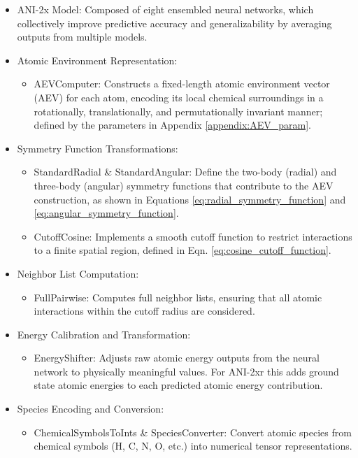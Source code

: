 \begin{itemize}
    \item ANI-2x Model: Composed of eight ensembled neural networks, which collectively improve predictive accuracy and generalizability by averaging outputs from multiple models.

    \item Atomic Environment Representation:
    \begin{itemize}
        \item AEVComputer: Constructs a fixed-length atomic environment vector (AEV) for each atom, encoding its local chemical surroundings in a rotationally, translationally, and permutationally invariant manner; defined by the parameters in Appendix \ref{appendix:AEV_param}.
    \end{itemize}

    \item Symmetry Function Transformations:
    \begin{itemize}
        \item StandardRadial \& StandardAngular: Define the two-body (radial) and three-body (angular) symmetry functions that contribute to the AEV construction, as shown in Equations \ref{eq:radial_symmetry_function} and \ref{eq:angular_symmetry_function}.
        \item CutoffCosine: Implements a smooth cutoff function to restrict interactions to a finite spatial region, defined in Eqn. \ref{eq:cosine_cutoff_function}.
    \end{itemize}

    \item Neighbor List Computation:
    \begin{itemize}
        \item FullPairwise: Computes full neighbor lists, ensuring that all atomic interactions within the cutoff radius are considered.
    \end{itemize}

    \item Energy Calibration and Transformation:
    \begin{itemize}
        \item EnergyShifter: Adjusts raw atomic energy outputs from the neural network to physically meaningful values. For ANI-2xr this adds ground state atomic energies to each predicted atomic energy contribution.
    \end{itemize}

    \item Species Encoding and Conversion:
    \begin{itemize}
        \item ChemicalSymbolsToInts \& SpeciesConverter: Convert atomic species from chemical symbols (H, C, N, O, etc.) into numerical tensor representations.
    \end{itemize}
\end{itemize}

